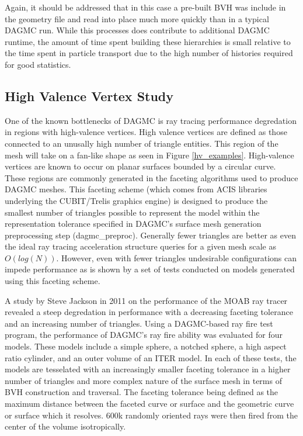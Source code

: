 \documentclass[12pt, a4paper]{article}
\begin{document}
Again, it should be addressed that in this case a pre-built BVH was include in the geometry file and read into place much more quickly than in a typical DAGMC run. While this processes does contribute to additional DAGMC runtime, the amount of time spent building these hierarchies is small relative to the time spent in particle transport due to the high number of histories required for good statistics.


\subsection{High Valence Vertex Study}%
\label{hv_study}

One of the known bottlenecks of DAGMC is ray tracing performance degredation in regions with high-valence vertices. High valence vertices are defined as those connected to an unusally high number of triangle entities. This region of the mesh will take on a fan-like shape as seen in Figure \ref{hv_examples}. High-valence vertices are known to occur on planar surfaces bounded by a circular curve. These regions are commonly generated in the faceting algorithms used to produce DAGMC meshes. This faceting scheme (which comes from ACIS libraries underlying the CUBIT/Trelis graphics engine) is designed to produce the smallest number of triangles possible to represent the model within the representation tolerance specified in DAGMC's surface mesh generation preprocessing step (dagmc\_preproc). Generally fewer triangles are better as even the ideal ray tracing acceleration structure queries for a given mesh scale as $O(log(N))$. However, even with fewer triangles undesirable configurations can impede performance as is shown by a set of tests conducted on models generated using this faceting scheme.

A study by Steve Jackson in 2011 on the performance of the MOAB ray tracer revealed a steep degredation in performance with a decreasing faceting tolerance and an increasing number of triangles. Using a DAGMC-based ray fire test program, the performance of DAGMC's ray fire ability was evaluated for four models. These models include a simple sphere, a notched sphere, a high aspect ratio cylinder, and an outer volume of an ITER model. In each of these tests, the models are tesselated with an increasingly smaller faceting tolerance in a higher number of triangles and more complex nature of the surface mesh in terms of BVH construction and traversal. The faceting tolerance being defined as the maximum distance between the faceted curve or surface and the geometric curve or surface which it resolves. 600k randomly oriented rays were then fired from the center of the volume isotropically.
\end{document}

